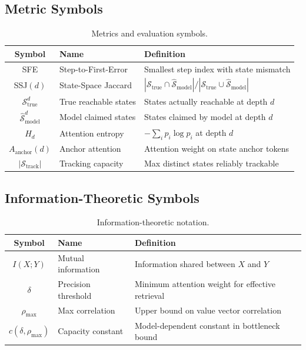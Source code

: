 \documentclass{article}
\theoremstyle{plain}
\theoremstyle{definition}
\theoremstyle{remark}
\newcommand{\sfe}{\textsc{SFE}}
\newcommand{\ssj}{\textsc{SSJ}}
\begin{document}
\subsection{Metric Symbols}

\begin{table}[h]
\centering
\caption{Metrics and evaluation symbols.}
\label{tab:notation_metrics}
\small
\begin{tabular}{@{}clp{7cm}@{}}
\toprule
\textbf{Symbol} & \textbf{Name} & \textbf{Definition} \\
\midrule
\sfe & Step-to-First-Error & Smallest step index with state mismatch \\
\ssj$(d)$ & State-Space Jaccard & $|\mathcal{S}_\text{true} \cap \hat{\mathcal{S}}_\text{model}| / |\mathcal{S}_\text{true} \cup \hat{\mathcal{S}}_\text{model}|$ \\
$\mathcal{S}_\text{true}^d$ & True reachable states & States actually reachable at depth $d$ \\
$\hat{\mathcal{S}}_\text{model}^d$ & Model claimed states & States claimed by model at depth $d$ \\
$H_d$ & Attention entropy & $-\sum_i p_i \log p_i$ at depth $d$ \\
$A_\text{anchor}(d)$ & Anchor attention & Attention weight on state anchor tokens \\
$|\mathcal{S}_\text{track}|$ & Tracking capacity & Max distinct states reliably trackable \\
\bottomrule
\end{tabular}
\end{table}

\subsection{Information-Theoretic Symbols}

\begin{table}[h]
\centering
\caption{Information-theoretic notation.}
\label{tab:notation_info}
\small
\begin{tabular}{@{}clp{7cm}@{}}
\toprule
\textbf{Symbol} & \textbf{Name} & \textbf{Definition} \\
\midrule
$I(X;Y)$ & Mutual information & Information shared between $X$ and $Y$ \\
$\delta$ & Precision threshold & Minimum attention weight for effective retrieval \\
$\rho_{\max}$ & Max correlation & Upper bound on value vector correlation \\
$c(\delta, \rho_{\max})$ & Capacity constant & Model-dependent constant in bottleneck bound \\
\bottomrule
\end{tabular}
\end{table}
\end{document}
